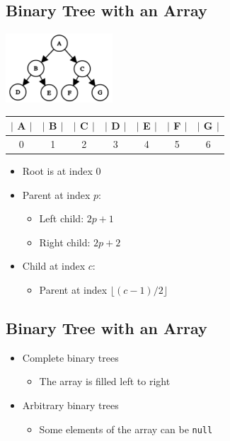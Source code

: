 \documentclass[10pt]{article}
\begin{document}
\subsection*{Binary Tree with an Array}
\begin{center}
    \includegraphics[width = 0.3\textwidth]{images/img00011}

    \begin{tabular}{@{}ccccccc@{}}\hline
    $|$ A $|$&$|$ B $|$&$|$ C $|$&$|$ D $|$&$|$ E $|$&$|$ F $|$&$|$ G $|$\\ \hline
    0 & 1 & 2 & 3 & 4 & 5 & 6 \\
    \end{tabular}
\end{center}
\begin{itemize}
    \item Root is at index 0
    \item Parent at index $p$:
    \begin{itemize}
        \item Left child: $2p+1$
        \item Right child: $2p+2$
    \end{itemize}
    \item Child at index $c$:
    \begin{itemize}
        \item Parent at index $\lfloor (c-1)/2 \rfloor$
    \end{itemize}
\end{itemize}

\subsection*{Binary Tree with an Array}
\begin{itemize}
    \item Complete binary trees
    \begin{itemize}
        \item The array is filled left to right
    \end{itemize}
    \item Arbitrary binary trees
    \begin{itemize}
        \item Some elements of the array can be \texttt{null}
    \end{itemize}
\end{itemize}
\end{document}
